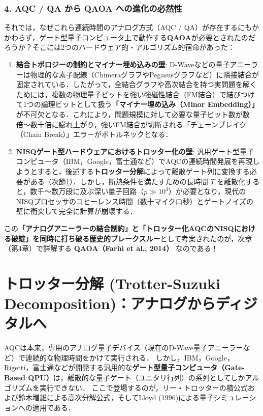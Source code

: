 \documentclass[11pt,a4paper,oneside,openany]{ltjsbook}
\theoremstyle{definition}
\theoremstyle{plain}
\theoremstyle{remark}
\begin{document}
\subsubsection*{4. AQC / QA から QAOA への進化の必然性}
それでは，なぜこれら連続時間のアナログ方式（AQC / QA）が存在するにもかかわらず，ゲート型量子コンピュータ上で動作する\textbf{QAOA}が必要とされたのだろうか？そこには2つのハードウェア的・アルゴリズム的宿命があった：

\begin{enumerate}
    \item \textbf{結合トポロジーの制約とマイナー埋め込みの壁}:
    D-Waveなどの量子アニーラーは物理的な素子配線（ChimeraグラフやPegasusグラフなど）に隣接結合が固定されている．したがって，全結合グラフや高次結合を持つ実問題を解くためには，複数の物理量子ビットを強い強磁性結合（FM結合）で結びつけて1つの論理ビットとして扱う\textbf{「マイナー埋め込み（Minor Embedding\cite{choi2008different}）」}が不可欠となる．これにより，問題規模に対して必要な量子ビット数が数倍〜数十倍に膨れ上がり，強いFM結合が切断される「チェーンブレイク（Chain Break）」エラーがボトルネックとなる．
    
    \item \textbf{NISQゲート型ハードウェアにおけるトロッター化の壁}:
    汎用ゲート型量子コンピュータ（IBM，Google，富士通など）でAQCの連続時間発展を再現しようとすると，後述する\textbf{トロッター分解}によって離散ゲート列に変換する必要がある（次節\ref{sec:trotter_detailed}）．しかし，断熱条件を満たすための長時間 $T$ を離散化すると，数千〜数万段に及ぶ深い量子回路（$p \gg 10^3$）が必要となり，現代のNISQプロセッサのコヒーレンス時間（数十マイクロ秒）とゲートノイズの壁に衝突して完全に計算が崩壊する．
\end{enumerate}

この\textbf{「アナログアニーラーの結合制約」と「トロッター化AQCのNISQにおける破綻」を同時に打ち破る歴史的ブレークスルー}として考案されたのが，次章（第4章）で詳解する \textbf{QAOA（Farhi et al., 2014\cite{farhi2014quantum}）} なのである！

\section{トロッター分解 (Trotter-Suzuki Decomposition)：アナログからディジタルへ}
\label{sec:trotter_detailed}

AQCは本来，専用のアナログ量子デバイス（現在のD-Wave量子アニーラーなど）で連続的な物理時間をかけて実行される．
しかし，IBM，Google，Rigetti，富士通などが開発する汎用的な\textbf{ゲート型量子コンピュータ（Gate-Based QPU）}は，離散的な量子ゲート（ユニタリ行列）の系列としてしかアルゴリズムを実行できない．
ここで登場するのが，リー・トロッターの積公式\cite{trotter1959product}および鈴木増雄による高次分解公式\cite{suzuki1976generalized}，そしてLloyd (1996)\cite{lloyd1996universal}による量子シミュレーションへの適用である．
\end{document}
